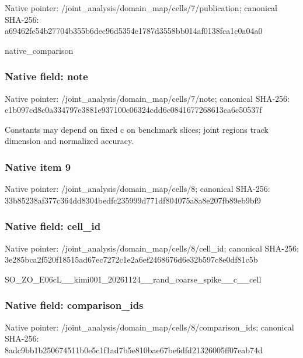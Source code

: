 \documentclass[10pt,a4paper]{article}
\begin{document}
Native pointer: /joint\_analysis/domain\_m\allowbreak{}ap/cells/7/publication; canonical SHA-256: a69462fe54b27704b355b6de\allowbreak{}c96d5354e1787d3558bb014a\allowbreak{}f0138fca1c0a04a0


native\_comparison


\subsubsection{Native field: note}


Native pointer: /joint\_analysis/domain\_map/cells/7/note; canonical SHA-256: c1b097cd8c0a334797e3881e\allowbreak{}937100c06324cdd6c0841677\allowbreak{}268613ca6c50537f


Constants may depend on fixed c on benchmark slices; joint regions track dimension and normalized accuracy.


\subsubsection{Native item 9}


Native pointer: /joint\_analysis/domain\_map/cells/8; canonical SHA-256: 33b85238af377c364dd8304b\allowbreak{}edfc235999d771df804075a8\allowbreak{}a8e207fb89eb9bf9



\subsubsection{Native field: cell\_id}


Native pointer: /joint\_analysis/domain\_m\allowbreak{}ap/cells/8/cell\_id; canonical SHA-256: 3e285bca2f520f18515ad67e\allowbreak{}c7272c1e2a6ef2468676d6e3\allowbreak{}2b597c8e0df81c5b


SO\_ZO\_E06cL\_\_kimi001\_202\allowbreak{}61124\_\_rand\_coarse\_spike\allowbreak{}\_\_c\_\_cell


\subsubsection{Native field: comparison\_ids}


Native pointer: /joint\_analysis/domain\_m\allowbreak{}ap/cells/8/comparison\_id\allowbreak{}s; canonical SHA-256: 8adc9bb1b250674511b0e5c1\allowbreak{}f1ad7b5e810bae67be6dfd21\allowbreak{}326005ff07eab74d
\end{document}
